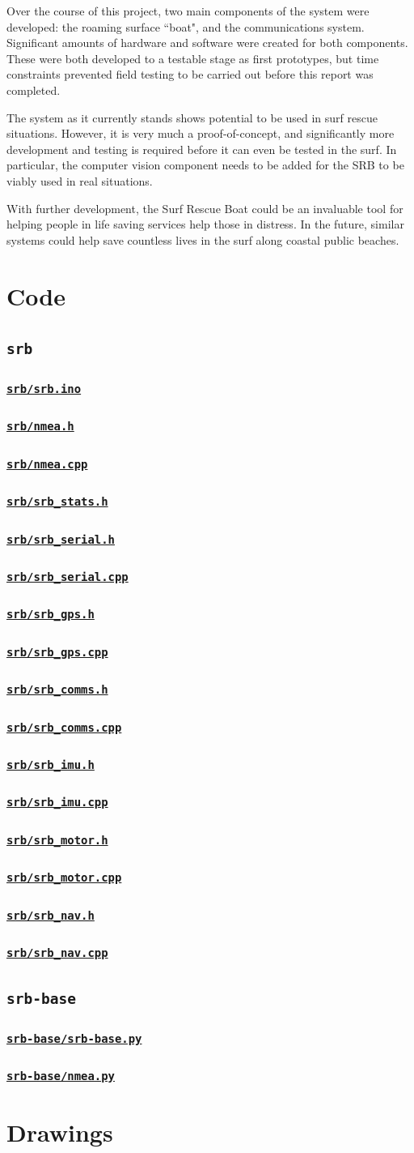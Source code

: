\documentclass[a4paper]{IEEEtran}
\newcommand{\srbsource}[2]{
\subsubsection{\texttt{\protect\url{#1}}} \mbox{}

}
\begin{document}
Over the course of this project, two main components of the system were developed: the roaming surface ``boat", and the communications system. Significant amounts of hardware and software were created for both components. These were both developed to a testable stage as first prototypes, but time constraints prevented field testing to be carried out before this report was completed.

The system as it currently stands shows potential to be used in surf rescue situations. However, it is very much a proof-of-concept, and significantly more development and testing is required before it can even be tested in the surf. In particular, the computer vision component needs to be added for the SRB to be viably used in real situations.

With further development, the Surf Rescue Boat could be an invaluable tool for helping people in life saving services help those in distress. In the future, similar systems could help save countless lives in the surf along coastal public beaches.
  



\clearpage
\appendices

\section{Code}

\subsection{\texttt{srb}}
\srbsource{srb/srb.ino}{C++}
\srbsource{srb/nmea.h}{C++}
\srbsource{srb/nmea.cpp}{C++}
\srbsource{srb/srb_stats.h}{C++}
\srbsource{srb/srb_serial.h}{C++}
\srbsource{srb/srb_serial.cpp}{C++}
\srbsource{srb/srb_gps.h}{C++}
\srbsource{srb/srb_gps.cpp}{C++}
\srbsource{srb/srb_comms.h}{C++}
\srbsource{srb/srb_comms.cpp}{C++}
\srbsource{srb/srb_imu.h}{C++}
\srbsource{srb/srb_imu.cpp}{C++}
\srbsource{srb/srb_motor.h}{C++}
\srbsource{srb/srb_motor.cpp}{C++}
\srbsource{srb/srb_nav.h}{C++}
\srbsource{srb/srb_nav.cpp}{C++}

\subsection{\texttt{srb-base}}
\srbsource{srb-base/srb-base.py}{Python}
\srbsource{srb-base/nmea.py}{Python}

\onecolumn
\section{Drawings}
\end{document}
